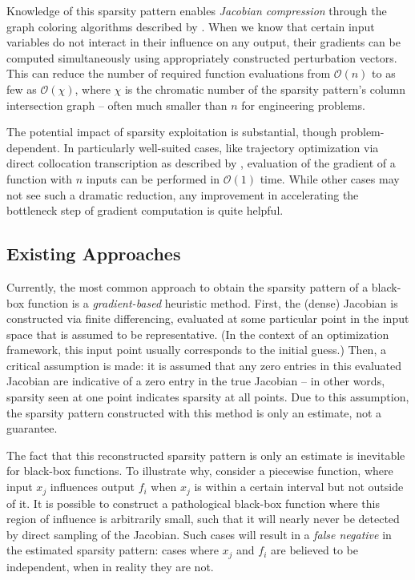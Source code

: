 \documentclass{article}
\begin{document}
Knowledge of this sparsity pattern enables \emph{Jacobian compression} through the graph coloring algorithms described by \cite{gebremedhinEfficientComputationSparse2009, gebremedhinWhatColorYour2005}. When we know that certain input variables do not interact in their influence on any output, their gradients can be computed simultaneously using appropriately constructed perturbation vectors. This can reduce the number of required function evaluations from $\mathcal{O}(n)$ to as few as $\mathcal{O}(\chi)$, where $\chi$ is the chromatic number of the sparsity pattern's column intersection graph -- often much smaller than $n$ for engineering problems.

The potential impact of sparsity exploitation is substantial, though problem-dependent. In particularly well-suited cases, like trajectory optimization via direct collocation transcription as described by \cite{kellyIntroductionTrajectoryOptimization2017,kellyTranscriptionMethodsTrajectory2017}, evaluation of the gradient of a function with $n$ inputs can be performed in $\mathcal{O}(1)$ time. While other cases may not see such a dramatic reduction, any improvement in accelerating the bottleneck step of gradient computation is quite helpful.

\subsection{Existing Approaches}
\label{sec:nan-existing-methods}

Currently, the most common approach to obtain the sparsity pattern of a black-box function is a \emph{gradient-based} heuristic method. First, the (dense) Jacobian is constructed via finite differencing, evaluated at some particular point in the input space that is assumed to be representative. (In the context of an optimization framework, this input point usually corresponds to the initial guess.) Then, a critical assumption is made: it is assumed that any zero entries in this evaluated Jacobian are indicative of a zero entry in the true Jacobian -- in other words, sparsity seen at one point indicates sparsity at all points. Due to this assumption, the sparsity pattern constructed with this method is only an estimate, not a guarantee.

The fact that this reconstructed sparsity pattern is only an estimate is inevitable for black-box functions. To illustrate why, consider a piecewise function, where input $x_j$ influences output $f_i$ when $x_j$ is within a certain interval but not outside of it. It is possible to construct a pathological black-box function where this region of influence is arbitrarily small, such that it will nearly never be detected by direct sampling of the Jacobian. Such cases will result in a \emph{false negative} in the estimated sparsity pattern: cases where $x_j$ and $f_i$ are believed to be independent, when in reality they are not.
\end{document}
